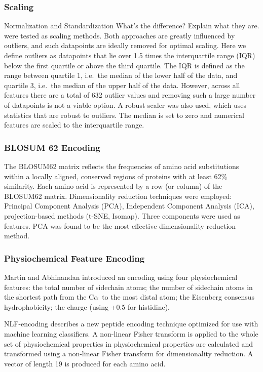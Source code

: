\documentclass[12pt]{article}
\newcommand{\ca}{\mbox{C$\alpha$}}
\newcommand{\lilian}[1]{ {\color{red}{\bfseries Lilian:} #1}}
\let\shortcite\cite
\begin{document}
\subsubsection{Scaling}
Normalization and Standardization\lilian{What's the difference? Explain what they are.} were tested as scaling methods. Both
approaches are greatly influenced by outliers, and such datapoints are
ideally removed for optimal scaling. Here we define outliers as
datapoints that lie over 1.5 times the interquartile range (IQR) below
the first quartile or above the third quartile. The IQR is defined as
the range between quartile 1, i.e.\ the median of the lower half of the
data, and quartile 3, i.e.\ the median of the upper half of the
data. However, across all features there are a total of 632 outlier
values and removing such a large number of datapoints is not a viable
option. A robust scaler\cite{XXXX} was also used, which uses statistics that are
robust to outliers. The median is set to zero and numerical features
are scaled to the interquartile range.

\subsubsection{BLOSUM 62 Encoding}
The BLOSUM62 matrix reflects the frequencies of amino acid
substitutions within a locally aligned, conserved regions of proteins
with at least 62\% similarity. Each amino acid is represented by a row
(or column) of the BLOSUM62 matrix. Dimensionality reduction
techniques were employed: Principal Component Analysis (PCA),
Independent Component Analysis (ICA), projection-based methods (t-SNE,
Isomap). Three components were used as features. PCA was found to be the most effective dimensionality reduction method. 

\subsubsection{Physiochemical Feature Encoding}
Martin and Abhinandan\shortcite{Abhinandan2010} introduced an encoding using
four physiochemical features:
the total number of sidechain atoms; the
number of sidechain atoms in the shortest path from the \ca\ to the most
distal atom; the Eisenberg consensus
hydrophobicity\cite{Eisenberg1982}; the charge (using +0.5 for histidine).

NLF-encoding \shortcite{Nanni2011} describes a new peptide encoding technique optimized for use with machine learning classifiers. A non-linear Fisher transform is applied to the whole set of physiochemical properties in \shortcite{Kawashima2000}
physiochemical properties are calculated and transformed using a
non-linear Fisher transform for dimensionality reduction.  A vector of
length 19 is produced for each amino acid.
\end{document}
